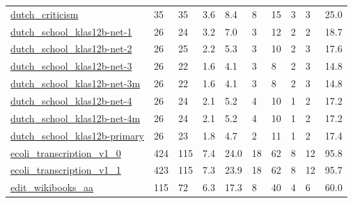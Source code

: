 \begin{longtable}{llllllllll}
 \href{http://vlado.fmf.uni-lj.si/pub/networks/data/esna/literature.htm}{dutch\_criticism}                                   & 35         & 35    & 3.6    & 8.4    & 8     & 15     & 3      & 3      & 25.0    \\
 \href{http://www.stats.ox.ac.uk/~snijders/siena/tutorial2010_data.htm}{dutch\_school\_klas12b-net-1}                         & 26         & 24    & 3.2    & 7.0    & 3     & 12     & 2      & 2      & 18.7    \\
 \href{http://www.stats.ox.ac.uk/~snijders/siena/tutorial2010_data.htm}{dutch\_school\_klas12b-net-2}                         & 26         & 25    & 2.2    & 5.3    & 3     & 10     & 2      & 3      & 17.6    \\
 \href{http://www.stats.ox.ac.uk/~snijders/siena/tutorial2010_data.htm}{dutch\_school\_klas12b-net-3}                         & 26         & 22    & 1.6    & 4.1    & 3     & 8      & 2      & 3      & 14.8    \\
 \href{http://www.stats.ox.ac.uk/~snijders/siena/tutorial2010_data.htm}{dutch\_school\_klas12b-net-3m}                        & 26         & 22    & 1.6    & 4.1    & 3     & 8      & 2      & 3      & 14.8    \\
 \href{http://www.stats.ox.ac.uk/~snijders/siena/tutorial2010_data.htm}{dutch\_school\_klas12b-net-4}                         & 26         & 24    & 2.1    & 5.2    & 4     & 10     & 1      & 2      & 17.2    \\
 \href{http://www.stats.ox.ac.uk/~snijders/siena/tutorial2010_data.htm}{dutch\_school\_klas12b-net-4m}                        & 26         & 24    & 2.1    & 5.2    & 4     & 10     & 1      & 2      & 17.2    \\
 \href{http://www.stats.ox.ac.uk/~snijders/siena/tutorial2010_data.htm}{dutch\_school\_klas12b-primary}                       & 26         & 23    & 1.8    & 4.7    & 2     & 11     & 1      & 2      & 17.4    \\
 \href{http://www.weizmann.ac.il/mcb/UriAlon/e-coli-transcription-network}{ecoli\_transcription\_v1\_0}                        & 424        & 115   & 7.4    & 24.0   & 18    & 62     & 8      & 12     & 95.8    \\
 \href{http://www.weizmann.ac.il/mcb/UriAlon/e-coli-transcription-network}{ecoli\_transcription\_v1\_1}                        & 423        & 115   & 7.3    & 23.9   & 18    & 62     & 8      & 12     & 95.7    \\
 \href{http://konect.cc/networks/edit-enwikibooks}{edit\_wikibooks\_aa}                                                       & 115        & 72    & 6.3    & 17.3   & 8     & 40     & 4      & 6      & 60.0    \\

\end{longtable}
